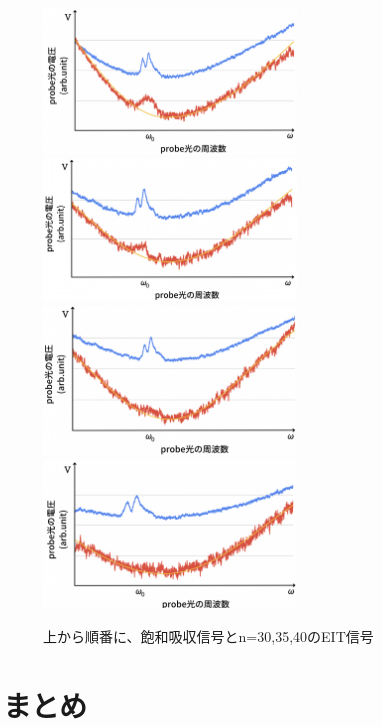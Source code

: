 \documentclass[dvipdfmx]{jsarticle}
\begin{document}
\begin{figure}[hbtp]
\centering
\includegraphics[width=0.6\textwidth]{images/eit30.png}
\includegraphics[width=0.6\textwidth]{images/eit35.png}
\includegraphics[width=0.6\textwidth]{images/eit40.png}
\includegraphics[width=0.6\textwidth]{images/eit45.png}
\caption{\label{fig:eitn}上から順番に、飽和吸収信号とn=30,35,40のEIT信号}
\end{figure}

\clearpage
\section{まとめ}





\end{document}
